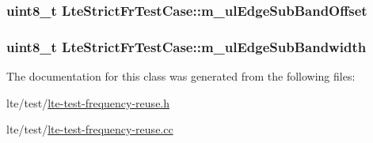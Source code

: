 \subsubsection[{\texorpdfstring{m\+\_\+ul\+Edge\+Sub\+Band\+Offset}{m_ulEdgeSubBandOffset}}]{\setlength{\rightskip}{0pt plus 5cm}uint8\+\_\+t Lte\+Strict\+Fr\+Test\+Case\+::m\+\_\+ul\+Edge\+Sub\+Band\+Offset\hspace{0.3cm}{\ttfamily [private]}}\hypertarget{classLteStrictFrTestCase_a92234751b6af7f82f3c576288619bbb2}{}\label{classLteStrictFrTestCase_a92234751b6af7f82f3c576288619bbb2}
\subsubsection[{\texorpdfstring{m\+\_\+ul\+Edge\+Sub\+Bandwidth}{m_ulEdgeSubBandwidth}}]{\setlength{\rightskip}{0pt plus 5cm}uint8\+\_\+t Lte\+Strict\+Fr\+Test\+Case\+::m\+\_\+ul\+Edge\+Sub\+Bandwidth\hspace{0.3cm}{\ttfamily [private]}}\hypertarget{classLteStrictFrTestCase_acef297528c21c8a9255794ecb0150b04}{}\label{classLteStrictFrTestCase_acef297528c21c8a9255794ecb0150b04}


The documentation for this class was generated from the following files\+:\begin{DoxyCompactItemize}
\item 
lte/test/\hyperlink{lte-test-frequency-reuse_8h}{lte-\/test-\/frequency-\/reuse.\+h}\item 
lte/test/\hyperlink{lte-test-frequency-reuse_8cc}{lte-\/test-\/frequency-\/reuse.\+cc}\end{DoxyCompactItemize}
